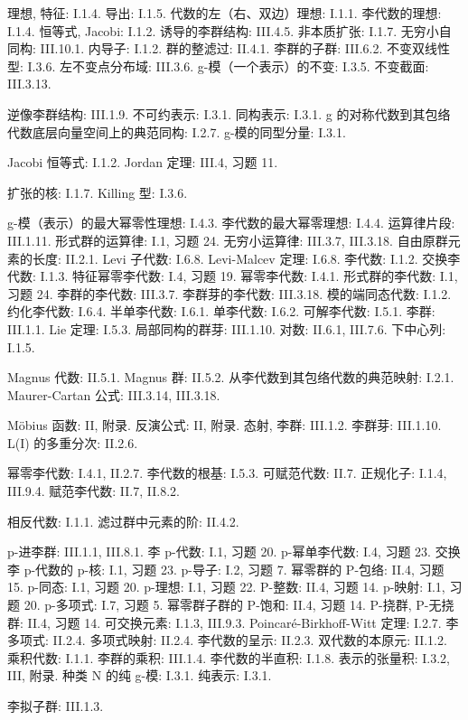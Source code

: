 理想, 特征: I.1.4. 导出: I.1.5. 代数的左（右、双边）理想: I.1.1. 李代数的理想: I.1.4. 恒等式, Jacobi: I.1.2. 诱导的李群结构: III.4.5. 非本质扩张: I.1.7. 无穷小自同构: III.10.1. 内导子: I.1.2. 群的整滤过: II.4.1. 李群的子群: III.6.2. 不变双线性型: I.3.6. 左不变点分布域: III.3.6. g-模（一个表示）的不变: I.3.5. 不变截面: III.3.13.

逆像李群结构: III.1.9. 不可约表示: I.3.1. 同构表示: I.3.1. g 的对称代数到其包络代数底层向量空间上的典范同构: I.2.7. g-模的同型分量: I.3.1.

Jacobi 恒等式: I.1.2. Jordan 定理: III.4, 习题 11.

扩张的核: I.1.7. Killing 型: I.3.6.

g-模（表示）的最大幂零性理想: I.4.3. 李代数的最大幂零理想: I.4.4. 运算律片段: III.1.11. 形式群的运算律: I.1, 习题 24. 无穷小运算律: III.3.7, III.3.18. 自由原群元素的长度: II.2.1. Levi 子代数: I.6.8. Levi-Malcev 定理: I.6.8. 李代数: I.1.2. 交换李代数: I.1.3. 特征幂零李代数: I.4, 习题 19. 幂零李代数: I.4.1. 形式群的李代数: I.1, 习题 24. 李群的李代数: III.3.7. 李群芽的李代数: III.3.18. 模的端同态代数: I.1.2. 约化李代数: I.6.4. 半单李代数: I.6.1. 单李代数: I.6.2. 可解李代数: I.5.1. 李群: III.1.1. Lie 定理: I.5.3. 局部同构的群芽: III.1.10. 对数: II.6.1, III.7.6. 下中心列: I.1.5.

Magnus 代数: II.5.1. Magnus 群: II.5.2. 从李代数到其包络代数的典范映射: I.2.1. Maurer-Cartan 公式: III.3.14, III.3.18.

Möbius 函数: II, 附录. 反演公式: II, 附录. 态射, 李群: III.1.2. 李群芽: III.1.10. L(I) 的多重分次: II.2.6.

幂零李代数: I.4.1, II.2.7. 李代数的根基: I.5.3. 可赋范代数: II.7. 正规化子: I.1.4, III.9.4. 赋范李代数: II.7, II.8.2.

相反代数: I.1.1. 滤过群中元素的阶: II.4.2.

p-进李群: III.1.1, III.8.1. 李 p-代数: I.1, 习题 20. p-幂单李代数: I.4, 习题 23. 交换李 p-代数的 p-核: I.1, 习题 23. p-导子: I.2, 习题 7. 幂零群的 P-包络: II.4, 习题 15. p-同态: I.1, 习题 20. p-理想: I.1, 习题 22. P-整数: II.4, 习题 14. p-映射: I.1, 习题 20. p-多项式: I.7, 习题 5. 幂零群子群的 P-饱和: II.4, 习题 14. P-挠群, P-无挠群: II.4, 习题 14. 可交换元素: I.1.3, III.9.3. Poincaré-Birkhoff-Witt 定理: I.2.7. 李多项式: II.2.4. 多项式映射: II.2.4. 李代数的呈示: II.2.3. 双代数的本原元: II.1.2. 乘积代数: I.1.1. 李群的乘积: III.1.4. 李代数的半直积: I.1.8. 表示的张量积: I.3.2, III, 附录. 种类 N 的纯 g-模: I.3.1. 纯表示: I.3.1.

李拟子群: III.1.3.

